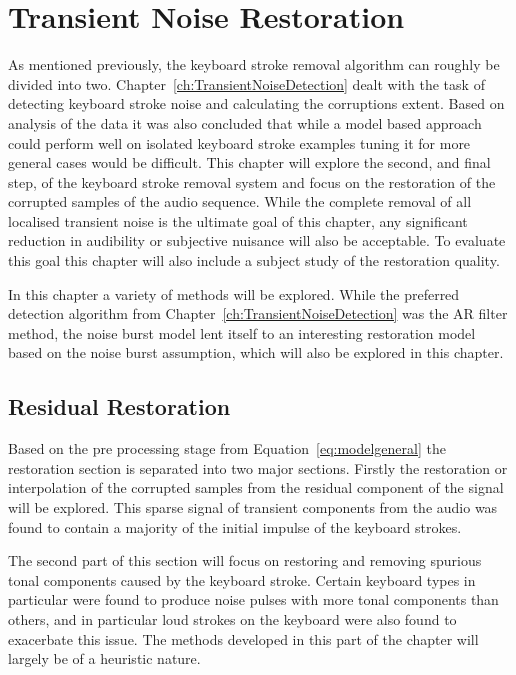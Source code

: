 \chapter{Transient Noise Restoration}\label{ch:TransientNoiseRestoration}

\ifpdf
    \graphicspath{{Chapter6_TransNoiseRest/Chapter6Figs/PNG/}{Chapter6_TransNoiseRest/Chapter6Figs/PDF/}{Chapter6_TransNoiseRest/Chapter6Figs/}{Chapter6_TransNoiseRest/Chapter6Figs/Subjective/}{Chapter6_TransNoiseRest/Chapter6Figs/Results/}}
\else
    \graphicspath{{Chapter6_TransNoiseRest/Chapter6Figs/EPS/}{Chapter6_TransNoiseRest/Chapter6Figs/}}
\fi

As mentioned previously, the keyboard stroke removal algorithm can roughly be divided into two. Chapter~\ref{ch:TransientNoiseDetection} dealt with the task of detecting keyboard stroke noise and calculating the corruptions extent. Based on analysis of the data it was also concluded that while a model based approach could perform well on isolated keyboard stroke examples tuning it for more general cases would be difficult. This chapter will explore the second, and final step, of the keyboard stroke removal system and focus on the restoration of the corrupted samples of the audio sequence. While the complete removal of all localised transient noise is the ultimate goal of this chapter, any significant reduction in audibility or subjective nuisance will also be acceptable. To evaluate this goal this chapter will also include a subject study of the restoration quality.

In this chapter a variety of methods will be explored. While the preferred detection algorithm from Chapter~\ref{ch:TransientNoiseDetection} was the AR filter method, the noise burst model lent itself to an interesting restoration model based on the noise burst assumption, which will also be explored in this chapter.

\section{Residual Restoration}
Based on the pre processing stage from Equation~\ref{eq:modelgeneral} the restoration section is separated into two major sections. Firstly the restoration or interpolation of the corrupted samples from the residual component of the signal will be explored. This sparse signal of transient components from the audio was found to contain a majority of the initial impulse of the keyboard strokes.

The second part of this section will focus on restoring and removing spurious tonal components caused by the keyboard stroke. Certain keyboard types in particular were found to produce noise pulses with more tonal components than others, and in particular loud strokes on the keyboard were also found to exacerbate this issue. The methods developed in this part of the chapter will largely be of a heuristic nature.

